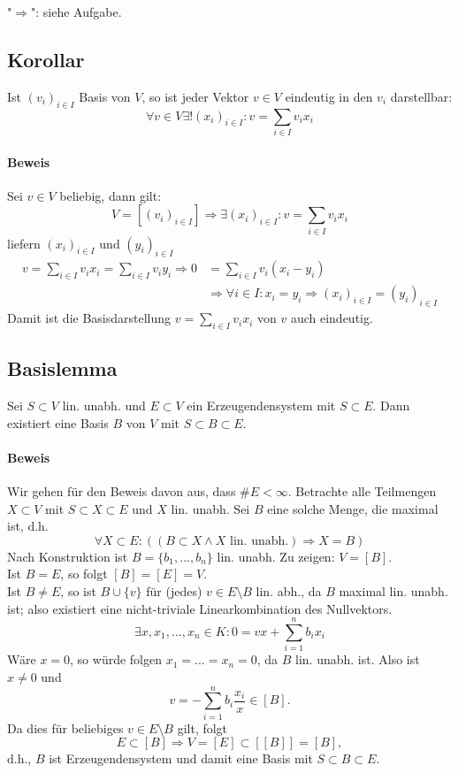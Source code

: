  		"$\Rightarrow$": siehe Aufgabe.

 \subsection{Korollar}
 	\begin{Korollar}
 		Ist $(v_i)_{i\in I}$ Basis von $ V $, so ist jeder Vektor $v\in V$ eindeutig in den $v_i$ darstellbar:
 		\[
 			\forall v\in V \exists! (x_i)_{i\in I}: v = \sum_{i\in I} v_ix_i
 		\]
 	\end{Korollar}

 	\paragraph{Beweis}
 		Sei $v\in V$ beliebig, dann gilt:
 		\[
 			V = [(v_i)_{i\in I}] \Rightarrow \exists (x_i)_{i\in I}: v = \sum_{i\in I} v_ix_i
 		\]
 		liefern $(x_i)_{i\in I}$ und $(y_i)_{i\in I}$
 		\begin{align*}
 			v = \sum_{i\in I} v_ix_i = \sum_{i\in I}v_iy_i \Rightarrow 0 & = \sum_{i\in I} v_i(x_i-y_i)                                                      \\
 			                                                             & \Rightarrow \forall i\in I: x_i = y_i \Rightarrow (x_i)_{i\in I} = (y_i)_{i\in I}
 		\end{align*}
 		Damit ist die Basisdarstellung $v = \sum_{i\in I} v_ix_i$ von $v$ auch eindeutig.

 \subsection{Basislemma}
 	\begin{Lemma}[Basislemma]
 		Sei $S\subset V$ lin. unabh. und $E\subset V$ ein Erzeugendensystem mit $S\subset E$. Dann existiert eine Basis $B$ von $V$ mit $S\subset B\subset E$.
 	\end{Lemma}

 	\paragraph{Beweis}
 		Wir gehen für den Beweis davon aus, dass $\#E<\infty$. Betrachte alle Teilmengen $X\subset V$ mit $S\subset X\subset E$ und $X$ lin. unabh. Sei $B$ eine solche Menge, die maximal ist, d.h.
 		\[
 			\forall X\subset E: ((B\subset X\land X\text{ lin. unabh.}) \Rightarrow X= B)
 		\]
 		Nach Konstruktion ist $B=\{b_1,...,b_n\}$ lin. unabh. Zu zeigen: $V=[B]$.\\
 		Ist $B=E$, so folgt $[B]=[E]=V$.\\
 		Ist $B\neq E$, so ist $B\cup \{v\} $ für (jedes) $v\in E\setminus B$ lin. abh., da $B$ maximal lin. unabh. ist; also existiert eine nicht-triviale Linearkombination des Nullvektors.
 		\[
 			\exists x,x_1,...,x_n \in K: 0=vx+\sum^n_{i=1}b_ix_i
 		\]
 		Wäre $x=0$, so würde folgen $x_1=...=x_n=0$, da $B$ lin. unabh. ist.
 		Also ist $x\neq 0$ und
 		\[
 			v=-\sum^n_{i=1} b_i\frac{x_i}{x} \in [B].
 		\]
 		Da dies für beliebiges $v\in E\setminus B$ gilt, folgt
 		\[
 			E\subset [B] \Rightarrow V=[E]\subset [[B]] = [B],
 		\]
 		d.h., $ B $ ist Erzeugendensystem und damit eine Basis mit $S\subset B\subset E$.

